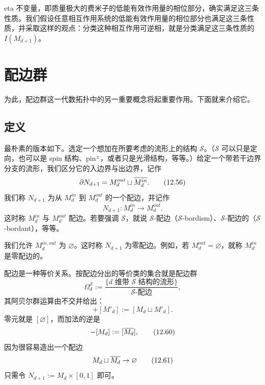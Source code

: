 eta 不变量，即质量极大的费米子的低能有效作用量的相位部分，确实满足这三条性质。我们假设任意相互作用系统的低能有效作用量的相位部分也满足这三条性质，并采取这样的观点：分类这种相互作用可逆相，就是分类满足这三条性质的 $I(M_{d+1})$。


\section{配边群}

为此，配边群这一代数拓扑中的另一重要概念将起重要作用。下面就来介绍它。

\subsection{定义}

最朴素的版本如下。选定一个想加在所要考虑的流形上的结构 $\mathcal S$。（$\mathcal S$ 可以只是定向，也可以是 spin 结构、pin$^\pm$，或者只是光滑结构，等等。）给定一个带若干边界分支的流形，我们区分它的入边界与出边界，记作
\begin{equation}
  \partial N_{d+1}=M^{out}_d\sqcup\overline{M^{in}_d}.
  \tag{12.56}
\end{equation}
我们称 $N_{d+1}$ 为从 $M^{in}_d$ 到 $M^{out}_d$ 的一个配边，并记作
\begin{equation}
  N_{d+1}:M^{in}_d\to M^{out}_d .
  \tag{12.57}
\end{equation}
这时称 $M^{in}_d$ 与 $M^{out}_d$ 配边。若要强调 $\mathcal S$，就说 $\mathcal S$-配边（$\mathcal S$-bordism）、$\mathcal S$-配边的（$\mathcal S$-bordant），等等。

我们允许 $M^{in,out}_d$ 为 $\varnothing$。这时称 $N_{d+1}$ 为零配边。例如，若 $M^{out}_d=\varnothing$，就称 $M^{in}_d$ 是零配边的。

配边是一种等价关系。按配边分出的等价类的集合就是配边群
\begin{equation}
  \Omega^{\mathcal S}_d:=
  \frac{\bigl\{\text{$d$ 维带 $\mathcal S$ 结构的流形}\bigr\}}
       {\text{$\mathcal S$-配边}} ,
  \tag{12.58}
\end{equation}
其阿贝尔群运算由不交并给出：
\begin{equation}
  [M_d]+[M'_d]:=[M_d\sqcup M'_d].
  \tag{12.59}
\end{equation}
零元就是 $[\varnothing]$，而加法的逆是
\begin{equation}
  -[M_d]:=[\overline{M_d}],
  \tag{12.60}
\end{equation}
因为很容易造出一个配边
\begin{equation}
  M_d\sqcup\overline{M_d}\to\varnothing
  \tag{12.61}
\end{equation}
只需令 $N_{d+1}:=M_d\times[0,1]$ 即可。

